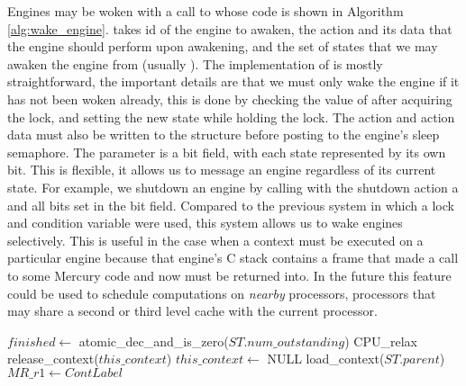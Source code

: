Engines may be woken with a call to \wakeengine whose code is shown in
Algorithm \ref{alg:wake_engine}.
\wakeengine takes id of the engine to awaken,
the action and its data that the engine should perform upon awakening,
and the set of states that we may awaken the engine from (usually
).
The implementation of \wakeengine is mostly straightforward,
the important details are that we must only wake the engine if it has not
been woken already, this is done by checking the value of
 after acquiring the lock,
and setting the new state while holding the lock.
The action and action data must also be written to the
\enginesleepsync structure before posting to the engine's sleep
semaphore.
The parameter  is a bit field, with each state represented by
its own bit.
This is flexible, it allows us to message an engine regardless of its
current state.
For example,
we shutdown an engine by calling \wakeengine with the shutdown action a and
all bits set in the  bit field.
Compared to the previous system in which a lock and condition variable were
used,
this system allows us to wake engines selectively.
This is useful in the case when a context must be executed on a particular
engine because that engine's C stack contains a frame that made a call to
some Mercury code and now must be returned into.
In the future this feature could be used to schedule computations on
\emph{nearby} processors,
processors that may share a second or third level cache with the current
processor.

\begin{algorithm}[tbp]
\begin{algorithmic}[1]
  \State $finished \gets$ atomic\_dec\_and\_is\_zero($ST.num\_outstanding$)
    \Else
        \State CPU\_relax
      \EndWhile
      \State release\_context($this\_context$)
      \State $this\_context \gets$ NULL
      \State load\_context($ST.parent$)
    \EndIf
  \Else
      \State $MR\_r1 \gets ContLabel$
    \Else
    \EndIf
  \EndIf
\EndProcedure
\end{algorithmic}
\caption{\joinandcontinue}
\label{alg:join_and_continue_ws2}
\end{algorithm}

